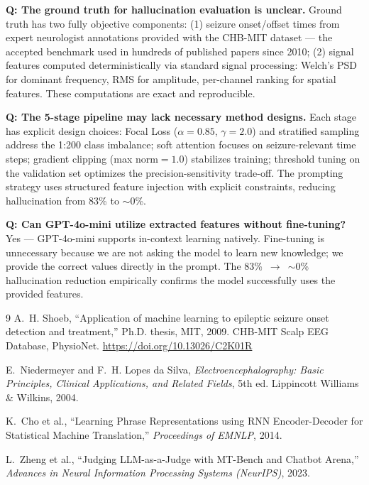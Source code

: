 \documentclass[11pt,twocolumn]{article}
\begin{document}
\textbf{Q: The ground truth for hallucination evaluation is unclear.}
Ground truth has two fully objective components: (1) seizure onset/offset
times from expert neurologist annotations provided with the CHB-MIT dataset —
the accepted benchmark used in hundreds of published papers since 2010;
(2) signal features computed deterministically via standard signal processing:
Welch's PSD for dominant frequency, RMS for amplitude, per-channel ranking
for spatial features. These computations are exact and reproducible.

\textbf{Q: The 5-stage pipeline may lack necessary method designs.}
Each stage has explicit design choices: Focal Loss ($\alpha{=}0.85$,
$\gamma{=}2.0$) and stratified sampling address the 1:200 class imbalance;
soft attention focuses on seizure-relevant time steps; gradient clipping
(max norm$=1.0$) stabilizes training; threshold tuning on the validation set
optimizes the precision-sensitivity trade-off. The prompting strategy uses
structured feature injection with explicit constraints, reducing hallucination
from 83\% to $\sim$0\%.

\textbf{Q: Can GPT-4o-mini utilize extracted features without fine-tuning?}
Yes — GPT-4o-mini supports in-context learning natively. Fine-tuning is
unnecessary because we are not asking the model to learn new knowledge; we
provide the correct values directly in the prompt. The 83\%~$\to$~$\sim$0\%
hallucination reduction empirically confirms the model successfully uses the
provided features.

\begin{thebibliography}{9}
A.~H. Shoeb, ``Application of machine learning to epileptic seizure onset
detection and treatment,'' Ph.D. thesis, MIT, 2009. CHB-MIT Scalp EEG
Database, PhysioNet. \url{https://doi.org/10.13026/C2K01R}

E.~Niedermeyer and F.~H. Lopes da Silva, \textit{Electroencephalography:
Basic Principles, Clinical Applications, and Related Fields}, 5th ed.
Lippincott Williams \& Wilkins, 2004.

K.~Cho et al., ``Learning Phrase Representations using RNN Encoder-Decoder
for Statistical Machine Translation,''
\textit{Proceedings of EMNLP}, 2014.

L.~Zheng et al., ``Judging LLM-as-a-Judge with MT-Bench and Chatbot Arena,''
\textit{Advances in Neural Information Processing Systems (NeurIPS)}, 2023.
\end{thebibliography}
\end{document}
